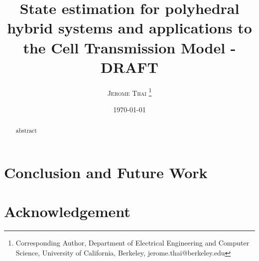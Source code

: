 \documentclass[11pt]{article}
\title{State estimation for polyhedral hybrid systems and applications to the Cell Transmission Model - DRAFT}
\date{\today}
\author{
        \textsc{Jerome Thai}
        \thanks{Corresponding Author, Department of Electrical Engineering and Computer Science, University of California, Berkeley, jerome.thai@berkeley.edu}
}
\numberwithin{equation}{section}
\numberwithin{figure}{section}
\numberwithin{table}{section}
\begin{document}
\maketitle

\begin{abstract}

abstract

\end{abstract}











\section{Conclusion and Future Work}

\section{Acknowledgement}





\end{document}
